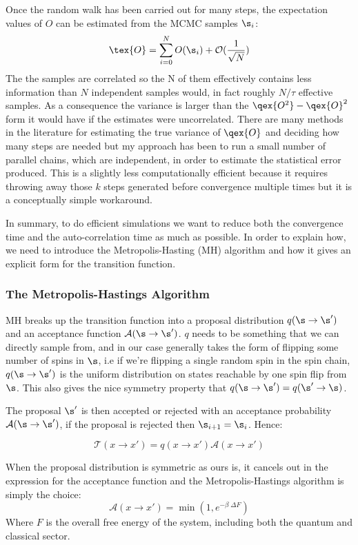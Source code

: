 Once the random walk has been carried out for many steps, the expectation values of \(O\) can be estimated from the MCMC samples \(\s_i\): \[
    \tex{O} = \sum_{i = 0}^{N} O(\s_i) + \mathcal{O}(\frac{1}{\sqrt{N}})
\] The the samples are correlated so the N of them effectively contains less information than \(N\) independent samples would, in fact roughly \(N/\tau\) effective samples. As a consequence the variance is larger than the \(\qex{O^2} - \qex{O}^2\) form it would have if the estimates were uncorrelated. There are many methods in the literature for estimating the true variance of \(\qex{O}\) and deciding how many steps are needed but my approach has been to run a small number of parallel chains, which are independent, in order to estimate the statistical error produced. This is a slightly less computationally efficient because it requires throwing away those \(k\) steps generated before convergence multiple times but it is a conceptually simple workaround.

In summary, to do efficient simulations we want to reduce both the convergence time and the auto-correlation time as much as possible. In order to explain how, we need to introduce the Metropolis-Hasting (MH) algorithm and how it gives an explicit form for the transition function.

\hypertarget{the-metropolis-hastings-algorithm}{%
\subsubsection{The Metropolis-Hastings Algorithm}\label{the-metropolis-hastings-algorithm}}

MH breaks up the transition function into a proposal distribution \(q(\s \to \s')\) and an acceptance function \(\mathcal{A}(\s \to \s')\). \(q\) needs to be something that we can directly sample from, and in our case generally takes the form of flipping some number of spins in \(\s\), i.e if we're flipping a single random spin in the spin chain, \(q(\s \to \s')\) is the uniform distribution on states reachable by one spin flip from \(\s\). This also gives the nice symmetry property that \(q(\s \to \s') = q(\s' \to \s)\).

The proposal \(\s'\) is then accepted or rejected with an acceptance probability \(\mathcal{A}(\s \to \s')\), if the proposal is rejected then \(\s_{i+1} = \s_{i}\). Hence:

\[\mathcal{T}(x\to x') = q(x\to x')\mathcal{A}(x \to x')\]

When the proposal distribution is symmetric as ours is, it cancels out in the expression for the acceptance function and the Metropolis-Hastings algorithm is simply the choice: \[ \mathcal{A}(x \to x') = \min\left(1, e^{-\beta\;\Delta F}\right)\] Where \(F\) is the overall free energy of the system, including both the quantum and classical sector.

